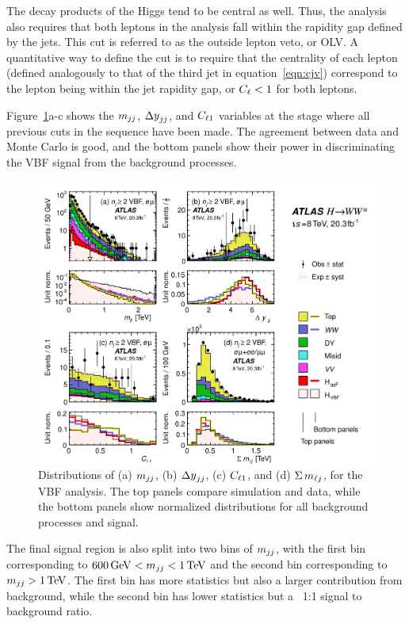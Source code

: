 The decay products of the Higgs tend to be central as well. Thus, the analysis also requires that both leptons in the analysis fall within the rapidity gap defined by the jets. This cut is referred to as the outside lepton veto, or OLV. A quantitative way to define the cut is to require that the centrality of each lepton (defined analogously to that of the third jet in equation~\ref{eqn:cjv}) correspond to the lepton being within the jet rapidity gap, or $C_{\ell} < 1$ for both leptons. 

Figure~\ref{fig:vbfvars}a-c shows the $m_{jj}$, $\dyjj$, and $C_{\ell1}$ variables at the stage where all previous cuts in the sequence have been made. The agreement between data and Monte Carlo is good, and the bottom panels show their power in discriminating the VBF signal from the background processes. 

\begin{figure}
  \centering
  \captionsetup{justification=centering}
  \includegraphics[width=\textwidth]{figures/VBF_vars}
  \caption{Distributions of (a) $m_{jj}$, (b) $\dyjj$, (c) $C_{\ell1}$, and (d) $\Sigma\,m_{\ell j}$, for the VBF analysis. The top panels compare simulation and data, while the bottom panels show normalized distributions for all background processes and signal\cite{WW2015}.}
  \label{fig:vbfvars}
\end{figure}

The final signal region is also split into two bins of $m_{jj}$, with the first bin corresponding to $600 \GeV < \mjj < 1 \TeV$ and the second bin corresponding to $\mjj > 1 \TeV$. The first bin has more statistics but also a larger contribution from background, while the second bin has lower statistics but a ~1:1 signal to background ratio. 


